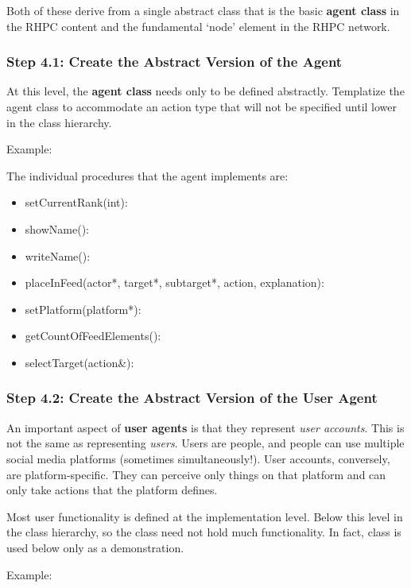 Both of these derive from a single abstract class that is the basic \textbf{agent class} in the RHPC content and the fundamental `node' element in the RHPC network.

\subsubsection{Step 4.1: Create the Abstract Version of the Agent}
At this level, the \textbf{agent class} needs only to be defined abstractly. Templatize the agent class to accommodate an action type that will not be specified until lower in the class hierarchy.

Example:

The individual procedures that the agent implements are:

\begin{itemize}
\item setCurrentRank(int):
\item showName():
\item writeName():
\item placeInFeed(actor*, target*, subtarget*, action, explanation):
\item setPlatform(platform*):
\item getCountOfFeedElements():
\item selectTarget(action\&):
\end{itemize}

\subsubsection{Step 4.2: Create the Abstract Version of the User Agent}
An important aspect of \textbf{user agents} is that they represent \textit{user accounts}. This is not the same as representing \textit{users}. Users are people, and people can use multiple social media platforms (sometimes simultaneously!). User accounts, conversely, are platform-specific. They can perceive only things on that platform and can only take actions that the platform defines.


Most user functionality is defined at the implementation level. Below this level in the class hierarchy, so the class need not hold much functionality. In fact, class is used below only as a demonstration.

Example:


